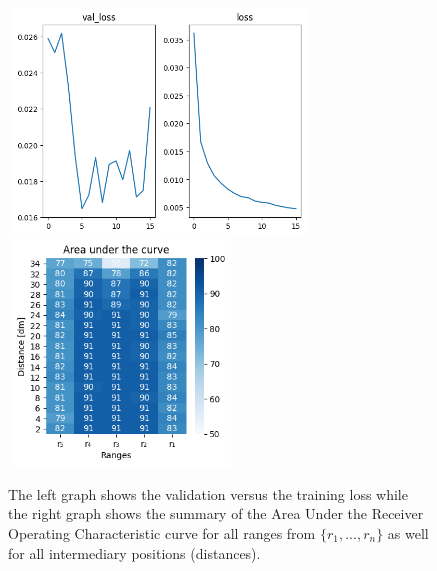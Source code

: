 \begin{multicols}{2}
\begin{itemize}
\end{itemize}
\end{multicols}\begin{figure}[H]%
\centering
\includegraphics[width=8cm,height=6cm]{3_models/models_60/graph_60.png}
\hspace{0.2 cm}
\includegraphics[width=6cm,height=6cm]{4_plots/plots_60/AUC_60.png}
\caption{The left graph shows the validation versus the training loss while the right graph shows the summary of the Area Under the Receiver Operating Characteristic curve for all ranges from $\{r_{1}, ... ,r_{n}\}$ as well for all intermediary positions (distances).}
\label{auc_60}
\end{figure}

\newpage
